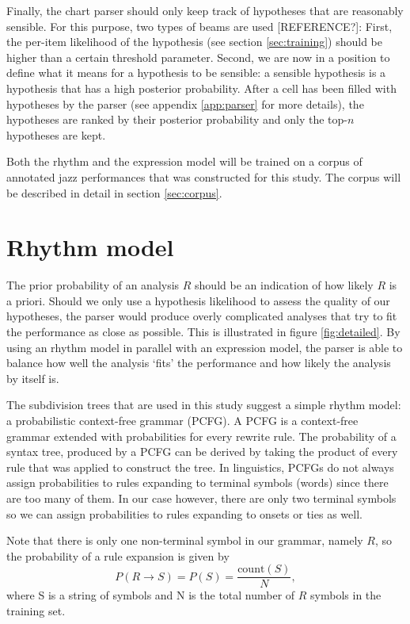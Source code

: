 
Finally, the chart parser should only keep track of hypotheses that are reasonably sensible. For this purpose, two types of beams are used [REFERENCE?]: First, the per-item likelihood of the hypothesis (see section \ref{sec:training}) should be higher than a certain threshold parameter. Second, we are now in a position to define what it means for a hypothesis to be sensible: a sensible hypothesis is a hypothesis that has a high posterior probability. After a cell has been filled with hypotheses by the parser (see appendix \ref{app:parser} for more details), the hypotheses are ranked by their posterior probability and only the top-$n$ hypotheses are kept.

Both the rhythm and the expression model will be trained on a corpus of annotated jazz performances that was constructed for this study. The corpus will be described in detail in section \ref{sec:corpus}.

\section{Rhythm model}
\label{sec:prior}

The prior probability of an analysis $R$ should be an indication of how likely $R$ is a priori. Should we only use a hypothesis likelihood to assess the quality of our hypotheses, the parser would produce overly complicated analyses that try to fit the performance as close as possible. This is illustrated in figure \ref{fig:detailed}. By using an rhythm model in parallel with an expression model, the parser is able to balance how well the analysis `fits' the performance and how likely the analysis by itself is.

The subdivision trees that are used in this study suggest a simple rhythm model: a probabilistic context-free grammar (PCFG). A PCFG is a context-free grammar extended with probabilities for every rewrite rule. The probability of a syntax tree, produced by a PCFG can be derived by taking the product of every rule that was applied to construct the tree. In linguistics, PCFGs do not always assign probabilities to rules expanding to terminal symbols (words) since there are too many of them. In our case however, there are only two terminal symbols so we can assign probabilities to rules expanding to onsets or ties as well.

Note that there is only one non-terminal symbol in our grammar, namely $R$, so the probability of a rule expansion is given by
\begin{equation}
P(R \rightarrow S) = P(S) = \frac{\mathrm{count}(S)}{N},
\end{equation}
where S is a string of symbols and N is the total number of $R$ symbols in the training set. 

